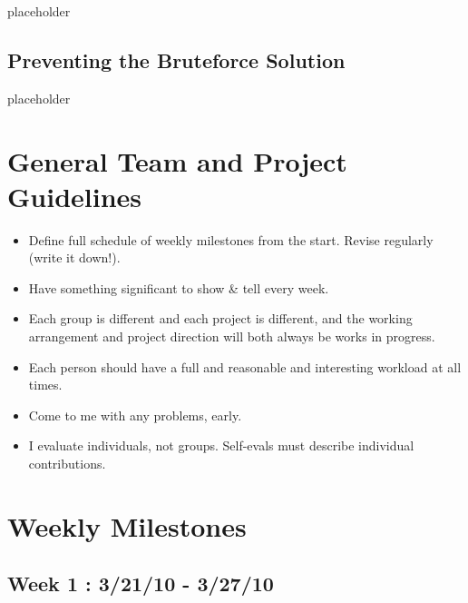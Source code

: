 \documentclass{article}
\begin{document}
placeholder

\subsection{Preventing the Bruteforce Solution}

placeholder

\section[General Team and Project Guidelines]{General Team and Project Guidelines}

\begin{itemize}

  \item Define full schedule of weekly milestones from the start. Revise regularly (write it down!).

  \item Have something significant to show \& tell every week.

  \item Each group is different and each project is different, and the working arrangement and project direction will both always be works in progress.

  \item Each person should have a full and reasonable and interesting workload at all times.

  \item Come to me with any problems, early.

  \item I evaluate individuals, not groups. Self-evals must describe individual contributions. 

\end{itemize}

\section[Weekly Milestones]{Weekly Milestones}

\subsection{Week 1 : 3/21/10 - 3/27/10}
\end{document}
